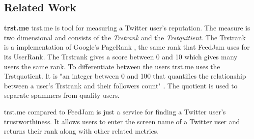 \subsection{Related Work}
{\bf trst.me} \newline
trst.me \citet{Infochimps2012b} is tool for measuring a Twitter user's reputation. The measure is two dimensional and consists of the \emph{ Trstrank} and the \emph{Trstquitient}. The Trstrank is a implementation of Google's PageRank \citep{Infochimps2012a}, the same rank that FeedJam uses for its UserRank. The Trstrank gives a score between 0 and 10 which gives many users the same rank. To differentiate between the users trst.me uses the Trstquotient. It is "an integer between 0 and 100 that quantifies the relationship between a user's Trstrank and their followers count" \citep{Infochimps2012}. The quotient is used to separate spammers from quality users. 

trst.me compared to FeedJam is just a service for finding a Twitter user's trustworthiness. It allows users to enter the screen name of a Twitter user and returns their rank along with other related metrics.

